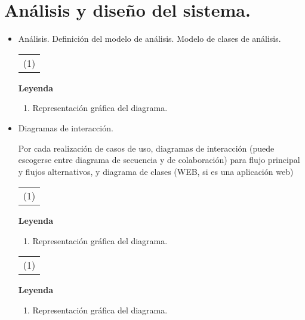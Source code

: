 \chapter{\large Análisis y diseño del sistema.}

\pagestyle{fancy}
\lhead{}
\chead{}
\lfoot{}
\cfoot{}
\rfoot{\thepage}
\renewcommand{\headrulewidth}{0.4pt}
\vspace{-1cm}

\begin{itemize}
 \item \lettrine[lines=2, lraise=0, nindent=0em, slope=-.5em]{A}{}nálisis.
    \subitem Definición del modelo de análisis. Modelo de clases de análisis.
\begin{longtable}[c]{|l|}
\hline
\rowcolor{gray}
\multicolumn{1}{|>{\columncolor{Light}}c|}{DIAGRAMA DE CLASES DE ANÁLISIS}\\
\hline
\multicolumn{1}{|c|}{(1)}\\
\hline
\end{longtable}
    {\bf Leyenda}
    \begin{enumerate}
     \item Representación gráfica del diagrama.
    \end{enumerate}

\item Diagramas de interacción.

Por cada realización de casos de uso, diagramas de interacción (puede escogerse entre diagrama de secuencia 
y de colaboración) para flujo principal y flujos alternativos, y diagrama de clases (WEB, si es una 
aplicación web)

\begin{longtable}[c]{|l|}
\hline
\rowcolor{gray}
\multicolumn{1}{|>{\columncolor{Light}}c|}{DIAGRAMA DE INTERACCIÓN}\\
\hline
\multicolumn{1}{|c|}{(1)}\\
\hline
\end{longtable}
    {\bf Leyenda}
    \begin{enumerate}
     \item Representación gráfica del diagrama.
    \end{enumerate}


\begin{longtable}[c]{|l|}
\hline
\rowcolor{gray}
\multicolumn{1}{|>{\columncolor{Light}}c|}{DIAGRAMA DE CLASES}\\
\hline
\multicolumn{1}{|c|}{(1)}\\
\hline
\end{longtable}
{\bf Leyenda}
    \begin{enumerate}
     \item Representación gráfica del diagrama.
    \end{enumerate}



\end{itemize}
